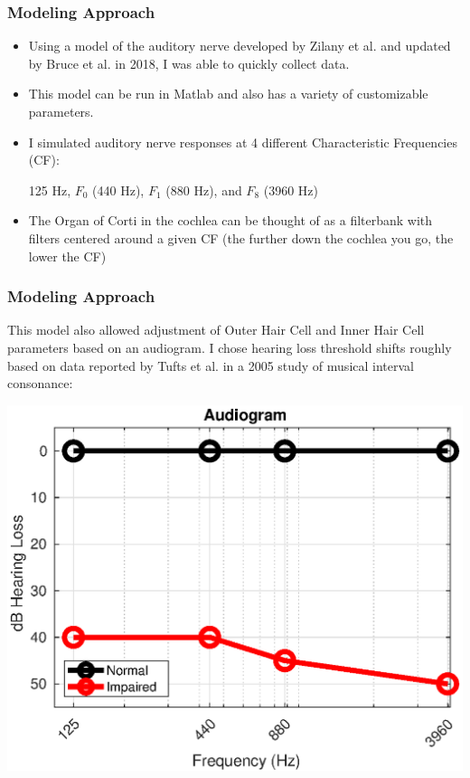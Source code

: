 \documentclass[aspectratio=1610]{beamer}
\begin{document}
\begin{frame}
\frametitle{Modeling Approach}

\begin{itemize}[label = $\blacktriangleright$]
\item Using a model of the auditory nerve developed by Zilany et al. and updated by Bruce et al. in 2018, I was able to quickly collect data. \vspace{.5em}

\item This model can be run in Matlab and also has a variety of customizable parameters.\vspace{.5em}

\item I simulated auditory nerve responses at 4 different Characteristic Frequencies (CF): \\
\begin{center}
125 Hz, $F_0$ (440 Hz), $F_1$ (880 Hz), and $F_8$ (3960 Hz)
\end{center}\vspace{.5em}

\item The Organ of Corti in the cochlea can be thought of as a filterbank with filters centered around a given CF (the further down the cochlea you go, the lower the CF) 
\end{itemize}

\end{frame}

\begin{frame}
\frametitle{Modeling Approach}
This model also allowed adjustment of Outer Hair Cell and Inner Hair Cell parameters based on an audiogram. I chose hearing loss threshold shifts roughly based on data reported by Tufts et al. in a 2005 study of musical interval consonance:\vspace{1em} 

\centering
\includegraphics[width = .6\textwidth]{audiogram} 

\end{frame}
\end{document}
